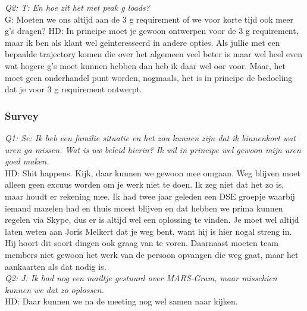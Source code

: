 \textit{Q2: T: En hoe zit het met peak g loads?}\\
G: Moeten we ons altijd aan de 3 g requirement of we voor korte tijd ook meer g's dragen?
HD: In principe moet je gewoon ontwerpen voor de 3 g requirement, maar ik ben als klant wel geïnteresseerd in andere opties. Als jullie met een bepaalde trajectory komen die over het algemeen veel beter is maar wel heel even wat hogere g's moet kunnen hebben dan heb ik daar wel oor voor. Maar, het moet geen onderhandel punt worden, nogmaals, het is in principe de bedoeling dat je voor 3 g requirement ontwerpt.


\subsubsection{Survey}
\textit{Q1: Se: Ik heb een familie situatie en het zou kunnen zijn dat ik binnenkort wat uren ga missen. Wat is uw beleid hierin? Ik wil in principe wel gewoon mijn uren goed maken.}\\
HD: Shit happens. Kijk, daar kunnen we gewoon mee omgaan. Weg blijven moet alleen geen excuus worden om je werk niet te doen. Ik zeg niet dat het zo is, maar houdt er rekening mee. Ik had twee jaar geleden een DSE groepje waarbij iemand mazelen had en thuis moest blijven en dat hebben we prima kunnen regelen via Skype, dus er is altijd wel een oplossing te vinden. Je moet wel altijd laten weten aan Joris Melkert dat je weg bent, want hij is hier nogal streng in. Hij hoort dit soort dingen ook graag van te voren. Daarnaast moeten team members niet gewoon het werk van de persoon opvangen die weg gaat, maar het aankaarten als dat nodig is.\\

\textit{Q2: J: Ik had nog een mailtje gestuurd over MARS-Gram, maar misschien kunnen we dat zo oplossen.}\\
HD: Daar kunnen we na de meeting nog wel samen naar kijken.\\

